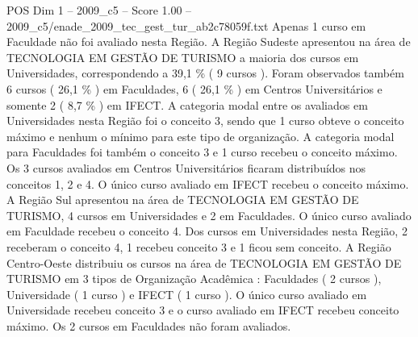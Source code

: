 \begin{textsample}{POS Dim 1 – 2009\_c5 – Score 1.00 – 2009\_c5/enade\_2009\_tec\_gest\_tur\_ab2c78059f.txt}
Apenas 1 curso em Faculdade não foi avaliado nesta Região.
A Região Sudeste apresentou na área de TECNOLOGIA EM GESTÃO DE TURISMO a maioria dos cursos em Universidades, correspondendo a 39,1 \% ( 9 cursos ).
Foram observados também 6 cursos ( 26,1 \% ) em Faculdades, 6 ( 26,1 \% ) em Centros Universitários e somente 2 ( 8,7 \% ) em IFECT.
A categoria modal entre os avaliados em Universidades nesta Região foi o conceito 3, sendo que 1 curso obteve o conceito máximo e nenhum o mínimo para este tipo de organização.
A categoria modal para Faculdades foi também o conceito 3 e 1 curso recebeu o conceito máximo.
Os 3 cursos avaliados em Centros Universitários ficaram distribuídos nos conceitos 1, 2 e 4.
O único curso avaliado em IFECT recebeu o conceito máximo.
A Região Sul apresentou na área de TECNOLOGIA EM GESTÃO DE TURISMO, 4 cursos em Universidades e 2 em Faculdades.
O único curso avaliado em Faculdade recebeu o conceito 4.
Dos cursos em Universidades nesta Região, 2 receberam o conceito 4, 1 recebeu conceito 3 e 1 ficou sem conceito.
A Região Centro-Oeste distribuiu os cursos na área de TECNOLOGIA EM GESTÃO DE TURISMO em 3 tipos de Organização Acadêmica : Faculdades ( 2 cursos ), Universidade ( 1 curso ) e IFECT ( 1 curso ).
O único curso avaliado em Universidade recebeu conceito 3 e o curso avaliado em IFECT recebeu conceito máximo.
Os 2 cursos em Faculdades não foram avaliados.

\end{textsample}
